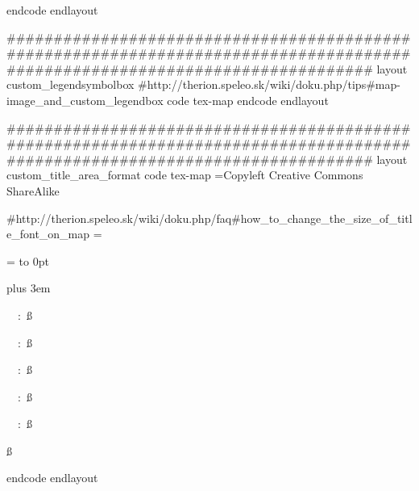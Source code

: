   endcode
endlayout

#############################################################################################################################
layout custom_legendsymbolbox
  #http://therion.speleo.sk/wiki/doku.php/tips#map-image_and_custom_legendbox
  code tex-map
	\def\legendsymbolbox#1#2{%
	  \setbox\tmpboxa=\hbox{\pdfrefxform#1}%
	  \setbox\tmpboxb=\hbox{\the\legendtextsize(}%
	  \legendsymbolwd=\wd\tmpboxa
	  \legendsymbolht=\ht\tmpboxa
	  \advance\legendsymbolht by -\ht\tmpboxb
	  \advance\legendsymbolht by -\ht\tmpboxb %
	  \advance\legendsymbolht by -20pt        %
	  \advance\legendsymbolht by -1dd
	  \tmpdimen=\hsize
	    \advance\tmpdimen by 10pt 
	    \divide\tmpdimen by\legendcolumns 
	    \advance\tmpdimen by-10pt
	  \hbox to \tmpdimen{%
	     \box\tmpboxa\kern10pt\raise\legendsymbolht\vtop{%
	       \advance\tmpdimen by -\legendsymbolwd
	       \advance\tmpdimen by -10pt
	       \hsize=\tmpdimen\rightskip=0pt plus \tmpdimen minus 0pt\relax\the\legendtextsize #2\vskip1dd}\hss}%

	  \advance\legendsymbolht by \ht\tmpboxb %
	  \advance\legendsymbolht by 20pt        %
	\box\tmpboxa\kern10pt\raise\legendsymbolht\vtop{}%

	}
  endcode
endlayout

#############################################################################################################################
layout custom_title_area_format
  code tex-map
  \copyrights={Copyleft Creative Commons ShareAlike}
  
  #http://therion.speleo.sk/wiki/doku.php/faq#how_to_change_the_size_of_title_font_on_map
    \legendcontent={%
      \hsize=\legendwidth
      \ifnortharrow\vbox to 0pt{\line{\hfil\northarrow}\vss}\fi
      \edef\tmp{\the\cavename} \ifx\tmp\empty \else
         {\size[120]\the\cavename} \vskip1cm
      \fi
      \ifscalebar\scalebar\vskip1cm\fi
      {\rightskip=0pt plus 3em\parskip=3bp
        \edef\tmp{\the\comment} \ifx\tmp\empty \else
           {\size[44]\the\comment} \par\medskip
         \fi
      \edef\tmp{\the\cavelength} \ifx\tmp\empty \else
        {\size[44]\si\the\cavelengthtitle: \ss\the\cavelength\par}
      \fi
      \edef\tmp{\the\cavedepth} \ifx\tmp\empty \else
        {\size[44]\si\the\cavedepthtitle: \ss\the\cavedepth\par}
      \fi
      \edef\tmp{\the\exploteam} \ifx\tmp\empty \else
        {\size[44]\si\the\explotitle:
        \ss\the\exploteam\quad\si\the\explodate\par}
      \fi
      \edef\tmp{\the\topoteam} \ifx\tmp\empty \else
        {\size[44]\si\the\topotitle: \ss\the\topoteam\quad\si\the\topodate\par}
      \fi
      \edef\tmp{\the\cartoteam} \ifx\tmp\empty \else
        {\size[44]\si\the\cartotitle:
        \ss\the\cartoteam\quad\si\the\cartodate\par}
      \fi
      \edef\tmp{\the\copyrights} \ifx\tmp\empty \else
        {\size[44]\ss\the\copyrights\par}
      \fi
     }
  }
  endcode
endlayout

